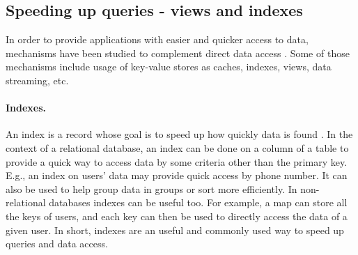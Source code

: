 



\subsection{Speeding up queries - views and indexes}

In order to provide applications with easier and quicker access to data, mechanisms have been studied to complement direct data access \cite{noria, dbtoaster, pequod, txcache, viewSelection, optIncMaintenance, effMaintenance, lazyMaintenance, genIndex, partIndex, dbproxy}. 
Some of those mechanisms include usage of key-value stores as caches, indexes, views, data streaming, etc.

\paragraph{Indexes.}
An index is a record whose goal is to speed up how quickly data is found \cite{partIndex, genIndex, mongoVScassandra}. %
In the context of a relational database, an index can be done on a column of a table to provide a quick way to access data by some criteria other than the primary key.
E.g., an index on users' data may provide quick access by phone number.
It can also be used to help group data in groups or sort more efficiently.
In non-relational databases indexes can be useful too. For example, a map can store all the keys of users, and each key can then be used to directly access the data of a given user.
In short, indexes are an useful and commonly used way to speed up queries and data access.

